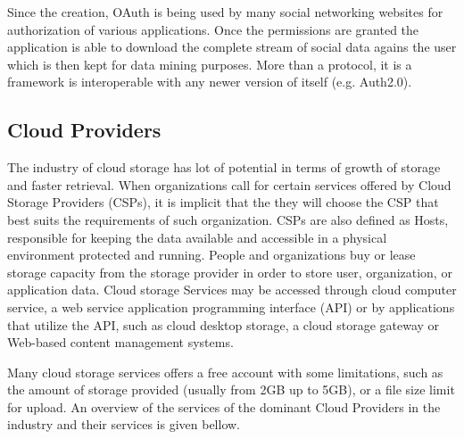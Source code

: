 \begin{itemize}
Since the creation, OAuth is being used by many social networking websites for authorization of various applications. Once the permissions are granted the application is able to download the complete stream of social data agains the user which is then kept for data mining purposes.%
More than a protocol, it is a framework is interoperable with any newer version of itself (e.g. Auth2.0).   
\end{itemize}

\subsection{Cloud Providers}\label{ssec:storage}

The industry of cloud storage has lot of potential in terms of growth of storage and faster retrieval. When organizations call for certain services offered by Cloud Storage Providers (CSPs), it is implicit that the they will choose the CSP that best suits the requirements of such organization. CSPs are also defined as Hosts, responsible for keeping the data available and accessible in a physical environment protected and running. People and organizations buy or lease storage capacity from the storage provider in order to store user, organization, or application data. Cloud storage Services may be accessed through cloud computer service, a web service application programming interface (API) or by applications that utilize the API, such as cloud desktop storage, a cloud storage gateway \cite{cloud:cloudStorageGateway} or Web-based content management systems.

Many cloud storage services offers a free account with some limitations, such as the amount of storage provided (usually from 2GB up to 5GB), or a file size limit for upload. 
An overview of the services  of the dominant Cloud Providers in the industry and their services is given bellow. 

